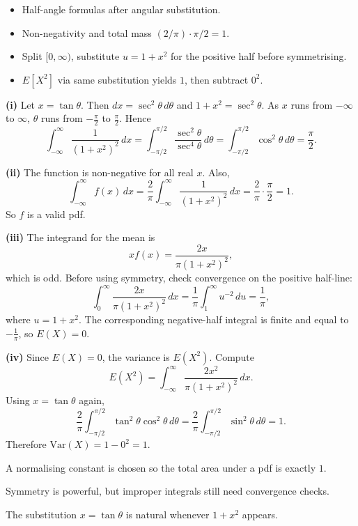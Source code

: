 \begin{hint}
\begin{itemize}[leftmargin=*]
\item Half-angle formulas after angular substitution.
\item Non-negativity and total mass $(2/\pi)\cdot\pi/2=1$.
\item Split $[0,\infty)$, substitute $u=1+x^{2}$ for the positive half before symmetrising.
\item $E[X^{2}]$ via same substitution yields $1$, then subtract $0^{2}$.
\end{itemize}
\end{hint}

\begin{solution}
\textbf{(i)} Let $x=\tan\theta$. Then $dx=\sec^2\theta\,d\theta$ and $1+x^2=\sec^2\theta$. As $x$ runs from $-\infty$ to $\infty$, $\theta$ runs from $-\frac{\pi}{2}$ to $\frac{\pi}{2}$. Hence
\[
\int_{-\infty}^{\infty}\frac{1}{(1+x^2)^2}\,dx
=\int_{-\pi/2}^{\pi/2}\frac{\sec^2\theta}{\sec^4\theta}\,d\theta
=\int_{-\pi/2}^{\pi/2}\cos^2\theta\,d\theta
=\frac{\pi}{2}.
\]

\textbf{(ii)} The function is non-negative for all real $x$. Also,
\[
\int_{-\infty}^{\infty}f(x)\,dx
=\frac{2}{\pi}\int_{-\infty}^{\infty}\frac{1}{(1+x^2)^2}\,dx
=\frac{2}{\pi}\cdot\frac{\pi}{2}=1.
\]
So $f$ is a valid pdf.

\textbf{(iii)} The integrand for the mean is
\[
xf(x)=\frac{2x}{\pi(1+x^2)^2},
\]
which is odd. Before using symmetry, check convergence on the positive half-line:
\[
\int_0^\infty \frac{2x}{\pi(1+x^2)^2}\,dx
=\frac{1}{\pi}\int_1^\infty u^{-2}\,du
=\frac1\pi,
\]
where $u=1+x^2$. The corresponding negative-half integral is finite and equal to $-\frac1\pi$, so $E(X)=0$.

\textbf{(iv)} Since $E(X)=0$, the variance is $E(X^2)$. Compute
\[
E(X^2)=\int_{-\infty}^{\infty}\frac{2x^2}{\pi(1+x^2)^2}\,dx.
\]
Using $x=\tan\theta$ again,
\[
\frac{2}{\pi}\int_{-\pi/2}^{\pi/2}\tan^2\theta\cos^2\theta\,d\theta
=\frac{2}{\pi}\int_{-\pi/2}^{\pi/2}\sin^2\theta\,d\theta
=1.
\]
Therefore $\mathrm{Var}(X)=1-0^2=\boxed{1}$.
\end{solution}

\begin{takeaways}
\item A normalising constant is chosen so the total area under a pdf is exactly $1$.
\item Symmetry is powerful, but improper integrals still need convergence checks.
\item The substitution $x=\tan\theta$ is natural whenever $1+x^2$ appears.
\end{takeaways}

